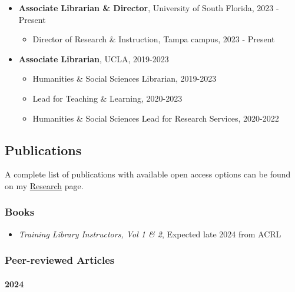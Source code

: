 \documentclass[
  letterpaper,
  DIV=11,
  numbers=noendperiod]{scrartcl}
\let\oldparagraph\paragraph
\renewcommand{\paragraph}[1]{\oldparagraph{#1}\mbox{}}
\providecommand{\tightlist}{%
  \setlength{\itemsep}{0pt}\setlength{\parskip}{0pt}}\usepackage{longtable,booktabs,array}
\begin{document}
\begin{itemize}
\tightlist
\item
  \textbf{Associate Librarian \& Director}, University of South Florida,
  2023 - Present

  \begin{itemize}
  \tightlist
  \item
    Director of Research \& Instruction, Tampa campus, 2023 - Present
  \end{itemize}
\item
  \textbf{Associate Librarian}, UCLA, 2019-2023

  \begin{itemize}
  \tightlist
  \item
    Humanities \& Social Sciences Librarian, 2019-2023
  \item
    Lead for Teaching \& Learning, 2020-2023
  \item
    Humanities \& Social Sciences Lead for Research Services, 2020-2022
  \end{itemize}
\end{itemize}

\subsection{\texorpdfstring{
Publications}{ Publications}}\label{publications}

A complete list of publications with available open access options can
be found on my \href{../research}{Research} page.

\subsubsection{\texorpdfstring{ Books}{ Books}}\label{books}

\begin{itemize}
\tightlist
\item
  \emph{Training Library Instructors, Vol 1 \& 2}, Expected late 2024
  from ACRL
\end{itemize}

\subsubsection{\texorpdfstring{ Peer-reviewed
Articles}{ Peer-reviewed Articles}}\label{peer-reviewed-articles}

\paragraph{2024}\label{section}
\end{document}
